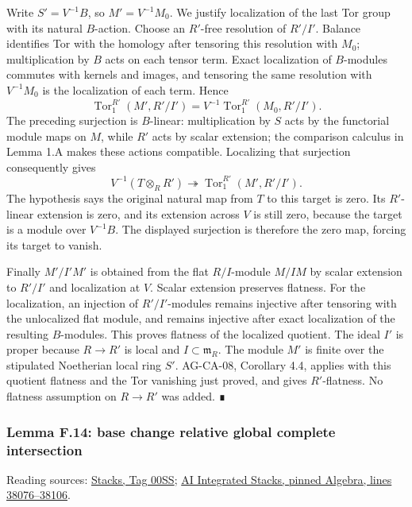 \documentclass[11pt,a4paper,openany]{report}
\begin{document}
Write \(S'=V^{-1}B\), so \(M'=V^{-1}M_0\). We justify localization of the last Tor group with its natural \(B\)-action. Choose an \(R'\)-free resolution of \(R'/I'\). Balance identifies Tor with the homology after tensoring this resolution with \(M_0\); multiplication by \(B\) acts on each tensor term. Exact localization of \(B\)-modules commutes with kernels and images, and tensoring the same resolution with \(V^{-1}M_0\) is the localization of each term. Hence \[\operatorname{Tor}_1^{R'}(M',R'/I')
=V^{-1}\operatorname{Tor}_1^{R'}(M_0,R'/I').\] The preceding surjection is \(B\)-linear: multiplication by \(S\) acts by the functorial module maps on \(M\), while \(R'\) acts by scalar extension; the comparison calculus in Lemma 1.A makes these actions compatible. Localizing that surjection consequently gives \[V^{-1}(T\otimes_RR')\twoheadrightarrow
\operatorname{Tor}_1^{R'}(M',R'/I').\] The hypothesis says the original natural map from \(T\) to this target is zero. Its \(R'\)-linear extension is zero, and its extension across \(V\) is still zero, because the target is a module over \(V^{-1}B\). The displayed surjection is therefore the zero map, forcing its target to vanish.

Finally \(M'/I'M'\) is obtained from the flat \(R/I\)-module \(M/IM\) by scalar extension to \(R'/I'\) and localization at \(V\). Scalar extension preserves flatness. For the localization, an injection of \(R'/I'\)-modules remains injective after tensoring with the unlocalized flat module, and remains injective after exact localization of the resulting \(B\)-modules. This proves flatness of the localized quotient. The ideal \(I'\) is proper because \(R\to R'\) is local and \(I\subset\mathfrak m_R\). The module \(M'\) is finite over the stipulated Noetherian local ring \(S'\). AG-CA-08, Corollary 4.4, applies with this quotient flatness and the Tor vanishing just proved, and gives \(R'\)-flatness. No flatness assumption on \(R\to R'\) was added. ∎

\label{AG-RG-S05-algebra-lemma-base-change-relative-global-complete-intersection}

\subsubsection{Lemma F.14: base change relative global complete intersection}\label{AG-RG-S05-lemma-f.14-base-change-relative-global-complete-intersection}

Reading sources: \href{https://stacks.math.columbia.edu/tag/00SS}{Stacks, Tag 00SS}; \href{https://github.com/KokunoYumeto/unofficial-stacks-project-ai-drafts/blob/565b10e987aba5969b21145a0833f42d69f96790/algebra.tex\#L38076-L38106}{AI Integrated Stacks, pinned Algebra, lines 38076--38106}.
\end{document}

